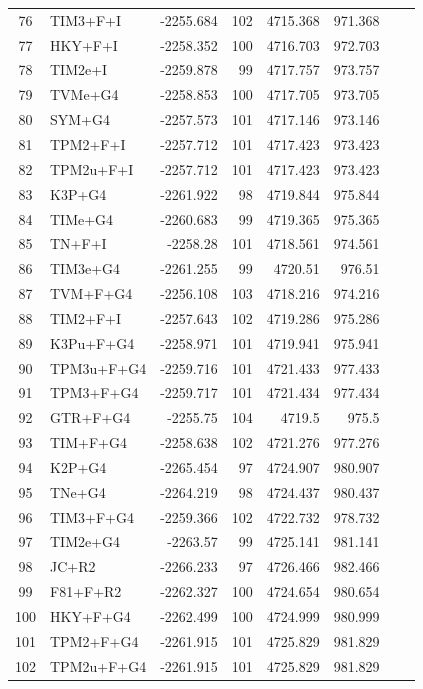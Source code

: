 \documentclass[12pt]{article}
\begin{document}
\begin{longtable}{clrrrrrr}
	76 & TIM3+F+I & -2255.684 & 102 & 4715.368 & 971.368 \\ 
	77 & HKY+F+I & -2258.352 & 100 & 4716.703 & 972.703 \\ 
	78 & TIM2e+I & -2259.878 & 99 & 4717.757 & 973.757 \\ 
	79 & TVMe+G4 & -2258.853 & 100 & 4717.705 & 973.705 \\ 
	80 & SYM+G4 & -2257.573 & 101 & 4717.146 & 973.146 \\ 
	81 & TPM2+F+I & -2257.712 & 101 & 4717.423 & 973.423 \\ 
	82 & TPM2u+F+I & -2257.712 & 101 & 4717.423 & 973.423 \\ 
	83 & K3P+G4 & -2261.922 & 98 & 4719.844 & 975.844 \\ 
	84 & TIMe+G4 & -2260.683 & 99 & 4719.365 & 975.365 \\ 
	85 & TN+F+I & -2258.28 & 101 & 4718.561 & 974.561 \\ 
	86 & TIM3e+G4 & -2261.255 & 99 & 4720.51 & 976.51 \\ 
	87 & TVM+F+G4 & -2256.108 & 103 & 4718.216 & 974.216 \\ 
	88 & TIM2+F+I & -2257.643 & 102 & 4719.286 & 975.286 \\ 
	89 & K3Pu+F+G4 & -2258.971 & 101 & 4719.941 & 975.941 \\ 
	90 & TPM3u+F+G4 & -2259.716 & 101 & 4721.433 & 977.433 \\ 
	91 & TPM3+F+G4 & -2259.717 & 101 & 4721.434 & 977.434 \\ 
	92 & GTR+F+G4 & -2255.75 & 104 & 4719.5 & 975.5 \\ 
	93 & TIM+F+G4 & -2258.638 & 102 & 4721.276 & 977.276 \\ 
	94 & K2P+G4 & -2265.454 & 97 & 4724.907 & 980.907 \\ 
	95 & TNe+G4 & -2264.219 & 98 & 4724.437 & 980.437 \\ 
	96 & TIM3+F+G4 & -2259.366 & 102 & 4722.732 & 978.732 \\ 
	97 & TIM2e+G4 & -2263.57 & 99 & 4725.141 & 981.141 \\ 
	98 & JC+R2 & -2266.233 & 97 & 4726.466 & 982.466 \\ 
	99 & F81+F+R2 & -2262.327 & 100 & 4724.654 & 980.654 \\ 
	100 & HKY+F+G4 & -2262.499 & 100 & 4724.999 & 980.999 \\ 
	101 & TPM2+F+G4 & -2261.915 & 101 & 4725.829 & 981.829 \\ 
	102 & TPM2u+F+G4 & -2261.915 & 101 & 4725.829 & 981.829 \\ 

\end{longtable}
\end{document}
